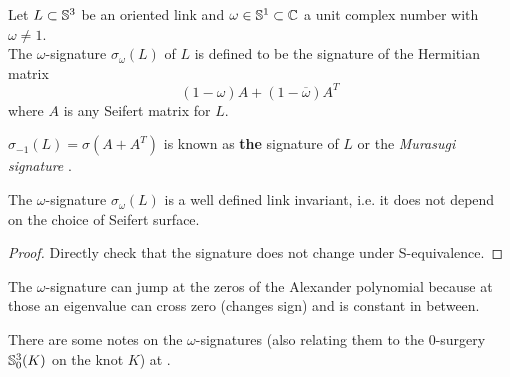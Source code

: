 \begin{definition}
	Let $L \subset \mathbb{S}^{3}$ be an oriented link and
	$\omega \in \mathbb{S}^{1} \subset \mathbb{C}$
	a unit complex number with $\omega \ne 1$. \\
	The $\omega$-signature $\sigma_{\omega}(L)$ of $L$
	is defined to be the signature of the Hermitian matrix
	\begin{equation*}
		(1 - \omega) A + (1 - \overline{\omega}) A^{T}
	\end{equation*}
	where $A$ is any Seifert matrix for $L$.
\end{definition}

\begin{definition}
	$\sigma_{-1}(L) = \sigma(A + A^{T})$
	is known as \textbf{the} signature of $L$
	or the \textit{Murasugi signature} .
\end{definition}

\begin{theorem}
	The $\omega$-signature $\sigma_{\omega}(L)$ is a well defined link invariant,
	i.e. it does not depend on the choice of Seifert surface.
\end{theorem}

\begin{proof}
	Directly check that the signature does not change under S-equivalence.
\end{proof}

The $\omega$-signature can jump at the zeros of the Alexander polynomial
because at those an eigenvalue can cross zero (changes sign)
and is constant in between.

There are some notes on the $\omega$-signatures
(also relating them to the $0$-surgery $\mathbb{S}^{3}_{0}(K)$
on the knot $K$) at \citep{conway2018notes}.



